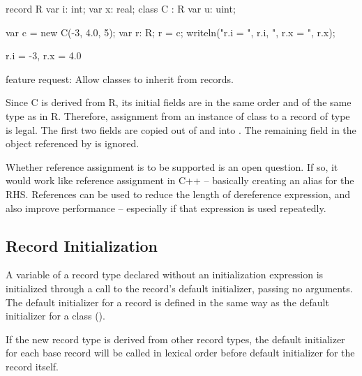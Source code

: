 \begin{example}
\begin{chapelpre}
\end{chapelpre}
\begin{chapel}
record R {
  var i: int;
  var x: real;
}
class C : R {
  var u: uint;
}

var c = new C(-3, 4.0, 5);
var r: R;
r = c;
writeln("r.i = ", r.i, ", r.x = ", r.x);
\end{chapel}
\begin{chapeloutput}
r.i = -3, r.x = 4.0
\end{chapeloutput}
\begin{chapelfuture}
feature request: Allow classes to inherit from records.
\end{chapelfuture}
\end{example}

Since C is derived from R, its initial fields are in the same order and of the
same type as in R.  Therefore, assignment from an instance of class  to
a record of type  is legal.
The first two fields are copied out of  and into .  The
remaining field in the object referenced by  is ignored.

\begin{openissue}
Whether reference assignment is to be supported is an open question.
If so, it would work like reference assignment in C++ -- basically creating an
alias for the RHS.
References can be used to reduce the length of dereference expression, and also
improve performance -- especially if that expression is used repeatedly.
\end{openissue}

\subsection{Record Initialization}
\label{Record_Initialization}

A variable of a record type declared without an initialization expression
is initialized through a call to the record's default initializer, passing no arguments.
The default initializer for a record is defined in the same way as the default
initializer for a class ().

If the new record type is derived from other record types, the
default initializer for each base record will be called in lexical order before default
initializer for the record itself.

